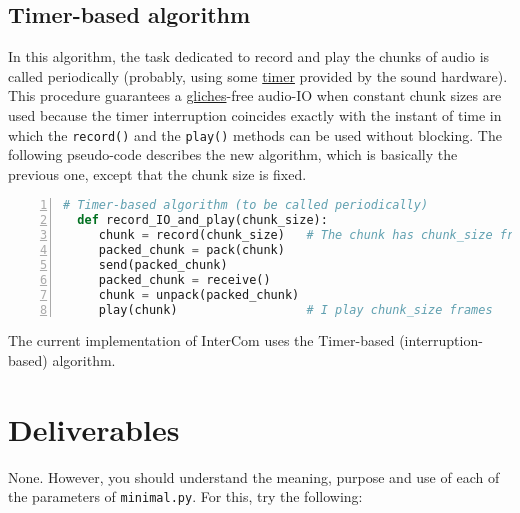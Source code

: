 \subsection{Timer-based algorithm}

In this algorithm, the task dedicated to record and play the chunks of
audio is called periodically (probably, using some
\href{https://en.wikipedia.org/wiki/Timer}{timer} provided by the
sound hardware). This procedure guarantees a
\href{https://en.wikipedia.org/wiki/Glitch}{gliches}-free audio-IO
when constant chunk sizes are used because the timer interruption
coincides exactly with the instant of time in which the
\verb|record()| and the \verb|play()| methods can be used without
blocking. The following pseudo-code describes the new algorithm, which
is basically the previous one, except that the chunk size is fixed.

\begin{lstlisting}[language=Python,numbers=left]
  # Timer-based algorithm (to be called periodically)
  def record_IO_and_play(chunk_size):
     chunk = record(chunk_size)   # The chunk has chunk_size frames
     packed_chunk = pack(chunk)
     send(packed_chunk)
     packed_chunk = receive()
     chunk = unpack(packed_chunk)
     play(chunk)                  # I play chunk_size frames
\end{lstlisting}


The current implementation of InterCom uses the Timer-based
(interruption-based) algorithm.

\section{Deliverables}

None. However, you should understand the meaning, purpose and use of
each of the parameters of \texttt{minimal.py}. For this, try the
following:

